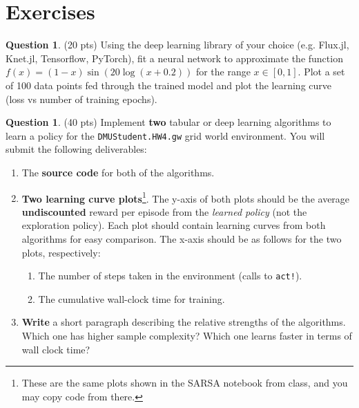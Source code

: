 \documentclass{article}
\theoremstyle{definition}
\newtheorem{question}[thm]{Question}
\begin{document}
\section{Exercises}

\begin{question}
(20 pts) Using the deep learning library of your choice (e.g. Flux.jl, Knet.jl, Tensorflow, PyTorch), fit a neural network to approximate the function $f(x) = (1-x) \sin(20 \log(x+0.2))$ for the range $x \in [0,1]$. Plot a set of 100 data points fed through the trained model and plot the learning curve (loss vs number of training epochs).
\end{question}

\begin{question}
    (40 pts) Implement \textbf{two} tabular or deep learning algorithms to learn a policy for the \texttt{DMUStudent.HW4.gw} grid world environment.     You will submit the following deliverables:

    \begin{enumerate}[label=\alph*)]
        \item The \textbf{source code} for both of the algorithms.
        \item \textbf{Two learning curve plots}\footnote{These are the same plots shown in the SARSA notebook from class, and you may copy code from there.}.  The y-axis of both plots should be the average \textbf{undiscounted} reward per episode from the \emph{learned policy} (not the exploration policy). Each plot should contain learning curves from both algorithms for easy comparison. The x-axis should be as follows for the two plots, respectively:
            \begin{enumerate}[label=\arabic*)]
                \item The number of steps taken in the environment (calls to \texttt{act!}).
                \item The cumulative wall-clock time for training.
            \end{enumerate}
        \item \textbf{Write} a short paragraph describing the relative strengths of the algorithms. Which one has higher sample complexity? Which one learns faster in terms of wall clock time?
    \end{enumerate}
\end{question}
\end{document}
